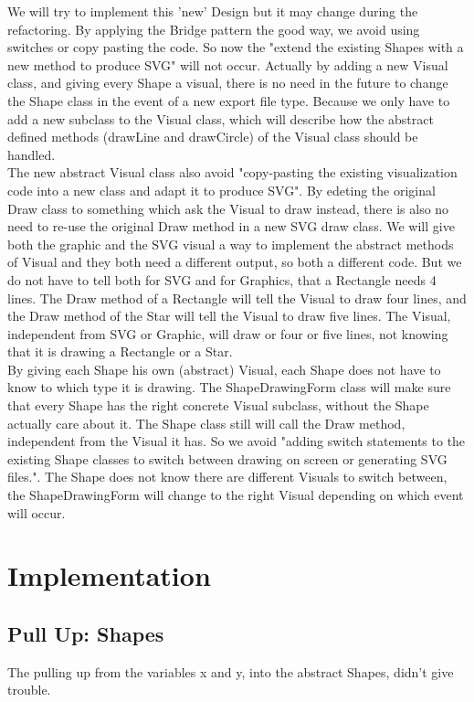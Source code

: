 \documentclass[a4paper,12pt]{article}
\begin{document}
We will try to implement this 'new' Design but it may change during the refactoring. By applying the Bridge pattern the good way, we avoid using switches or copy pasting the code. So now the "extend the existing Shapes with a new method to produce SVG" will not occur. Actually by adding a new Visual class, and giving every Shape a visual, there is no need in the future to change the Shape class in the event of a new export file type. Because we only have to add a new subclass to the Visual class, which will describe how the abstract defined methods (drawLine and drawCircle) of the Visual class should be handled.
\\
The new abstract Visual class also avoid "copy-pasting the existing visualization code into a new class and adapt it to produce SVG". By edeting the original Draw class to something which ask the Visual to draw instead, there is also no need to re-use the original Draw method in a new SVG draw class. We will give both the graphic and the SVG visual a way to implement the abstract methods of Visual and they both need a different output, so both a different code. But we do not have to tell both for SVG and for Graphics, that a Rectangle needs 4 lines. The Draw method of a Rectangle will tell the Visual to draw four lines, and the Draw method of the Star will tell the Visual to draw five lines. The Visual, independent from SVG or Graphic, will draw or four or five lines, not knowing that it is drawing a Rectangle or a Star.
\\
By giving each Shape his own (abstract) Visual, each Shape does not have to know to which type it is drawing. The ShapeDrawingForm class will make sure that every Shape has the right concrete Visual subclass, without the Shape actually care about it. The Shape class still will call the Draw method, independent from the Visual it has. So we avoid "adding switch statements to the existing Shape classes to switch between drawing on screen or generating SVG files.". The Shape does not know there are different Visuals to switch between, the ShapeDrawingForm will change to the right Visual depending on which event will occur.


\section{Implementation}

\subsection{Pull Up: Shapes}
The pulling up from the variables x and y, into the abstract Shapes, didn't give trouble.
\end{document}
